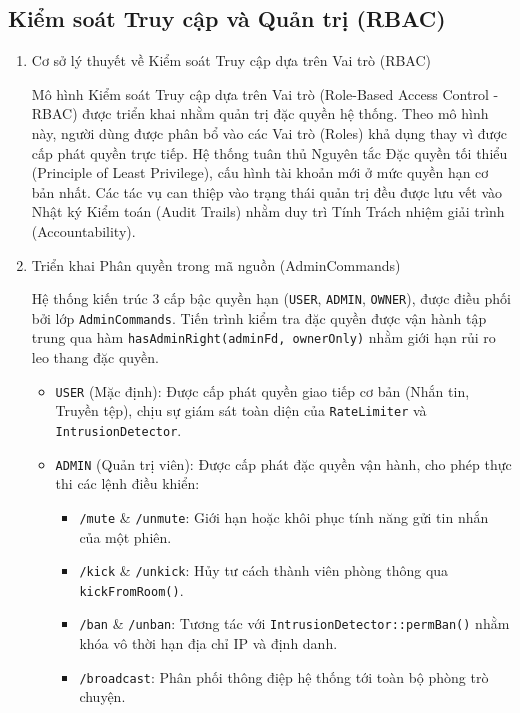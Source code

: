 \subsection{Kiểm soát Truy cập và Quản trị (RBAC)}

\begin{enumerate}
    \item Cơ sở lý thuyết về Kiểm soát Truy cập dựa trên Vai trò (RBAC)
    
    Mô hình Kiểm soát Truy cập dựa trên Vai trò (Role-Based Access Control - RBAC) được triển khai nhằm quản trị đặc quyền hệ thống. Theo mô hình này, người dùng được phân bổ vào các Vai trò (Roles) khả dụng thay vì được cấp phát quyền trực tiếp. Hệ thống tuân thủ Nguyên tắc Đặc quyền tối thiểu (Principle of Least Privilege), cấu hình tài khoản mới ở mức quyền hạn cơ bản nhất. Các tác vụ can thiệp vào trạng thái quản trị đều được lưu vết vào Nhật ký Kiểm toán (Audit Trails) nhằm duy trì Tính Trách nhiệm giải trình (Accountability).

    \item Triển khai Phân quyền trong mã nguồn (AdminCommands)
    
    Hệ thống kiến trúc 3 cấp bậc quyền hạn (\texttt{USER}, \texttt{ADMIN}, \texttt{OWNER}), được điều phối bởi lớp \texttt{AdminCommands}. Tiến trình kiểm tra đặc quyền được vận hành tập trung qua hàm \texttt{hasAdminRight(adminFd, ownerOnly)} nhằm giới hạn rủi ro leo thang đặc quyền.
    
    \begin{itemize}[label={-}]
        \item \texttt{USER} (Mặc định): Được cấp phát quyền giao tiếp cơ bản (Nhắn tin, Truyền tệp), chịu sự giám sát toàn diện của \texttt{RateLimiter} và \texttt{IntrusionDetector}.
        
        \item \texttt{ADMIN} (Quản trị viên): Được cấp phát đặc quyền vận hành, cho phép thực thi các lệnh điều khiển:
        \begin{itemize}[label={$\circ$}]
            \item \texttt{/mute} \& \texttt{/unmute}: Giới hạn hoặc khôi phục tính năng gửi tin nhắn của một phiên.
            \item \texttt{/kick} \& \texttt{/unkick}: Hủy tư cách thành viên phòng thông qua \texttt{kickFromRoom()}.
            \item \texttt{/ban} \& \texttt{/unban}: Tương tác với \texttt{IntrusionDetector::permBan()} nhằm khóa vô thời hạn địa chỉ IP và định danh.
            \item \texttt{/broadcast}: Phân phối thông điệp hệ thống tới toàn bộ phòng trò chuyện.
        \end{itemize}
        

\end{itemize}
\end{enumerate}
